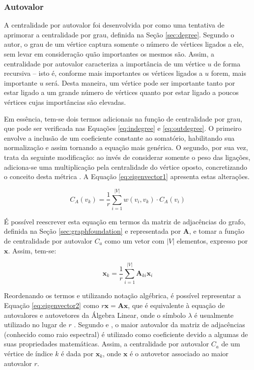 \subsubsection{Autovalor} \label{sec:eigenvector}

A centralidade por autovalor foi desenvolvida por  como uma tentativa de aprimorar a centralidade por grau, definida na Seção \ref{sec:degree}. Segundo o autor, o grau de um vértice captura somente o número de vértices ligados a ele, sem levar em consideração quão importantes os mesmos são. Assim, a centralidade por autovalor caracteriza a importância de um vértice $u$ de forma recursiva -- isto é, conforme mais importantes os vértices ligados a $u$ forem, mais importante $u$ será. Desta maneira, um vértice pode ser importante tanto por estar ligado a um grande número de vértices quanto por estar ligado a poucos vértices cujas importâncias são elevadas.

Em essência, tem-se dois termos adicionais na função de centralidade por grau, que pode ser verificada nas Equações \ref{eq:indegree} e \ref{eq:outdegree}. O primeiro envolve a inclusão de um coeficiente constante ao somatório, habilitando sua normalização e assim tornando a equação mais genérica. O segundo, por sua vez, trata da seguinte modificação: ao invés de considerar somente o peso das ligações, adiciona-se uma multiplicação pela centralidade do vértice oposto, concretizando o conceito desta métrica \cite{Newman2010}. A Equação \ref{eq:eigenvector1} apresenta estas alterações.

\begin{equation}
    \label{eq:eigenvector1}
    C_A(v_k) = \frac{1}{r} \sum_{i=1}^{|V|} w(v_i, v_k) \cdot C_A(v_i) %
\end{equation}

É possível reescrever esta equação em termos da matriz de adjacências do grafo, definida na Seção \ref{sec:graphfoundation} e representada por $\mathbf{A}$, e tomar a função de centralidade por autovalor $C_a$ como um vetor com $|V|$ elementos, expresso por $\mathbf{x}$. Assim, tem-se:

\begin{equation}
    \label{eq:eigenvector2}
    \mathbf{x}_k = \frac{1}{r} \sum_{i=1}^{|V|} \mathbf{A}_{ki} \mathbf{x}_i
\end{equation}

Reordenando os termos e utilizando notação algébrica, é possível representar a Equação \ref{eq:eigenvector2} como $r\mathbf{x} = \mathbf{Ax}$, que é equivalente à equação de autovalores e autovetores da Álgebra Linear, onde o símbolo $\lambda$ é usualmente utilizado no lugar de $r$ \cite{Newman2010}. Segundo  e , o maior autovalor da matriz de adjacências (conhecido como raio espectral) é utilizado como coeficiente devido a algumas de suas propriedades matemáticas. Assim, a centralidade por autovalor $C_a$ de um vértice de índice $k$ é dada por $\mathbf{x}_k$, onde $\mathbf{x}$ é o autovetor associado ao maior autovalor $r$.

